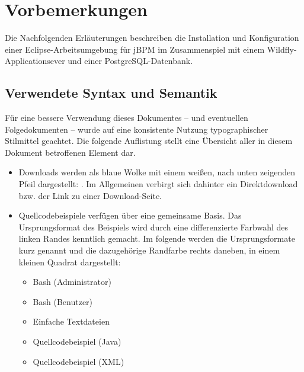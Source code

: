 \section{Vorbemerkungen}
Die Nachfolgenden Erläuterungen beschreiben die Installation und Konfiguration einer Eclipse-Arbeitsumgebung für jBPM im Zusammenspiel mit einem Wildfly-Applicationsever und einer PostgreSQL-Datenbank.
\subsection{Verwendete Syntax und Semantik}
Für eine bessere Verwendung dieses Dokumentes -- und eventuellen Folgedokumenten -- wurde auf eine konsistente Nutzung typographischer Stilmittel geachtet. Die folgende Auflistung stellt eine Übersicht aller in diesem Dokument betroffenen Element dar.

\begin{itemize}
	\item Downloads werden als blaue Wolke mit einem weißen, nach unten zeigenden Pfeil dargestellt: . Im Allgemeinen verbirgt sich dahinter ein Direktdownload bzw. der Link zu einer Download-Seite.
	\item Quellcodebeispiele verfügen über eine gemeinsame Basis. Das Ursprungsformat des Beispiels wird durch eine differenzierte Farbwahl des linken Randes kenntlich gemacht. Im folgende werden die Ursprungsformate kurz genannt und die dazugehörige Randfarbe rechts daneben, in einem kleinen Quadrat dargestellt:
	\begin{itemize}
		\item Bash (Administrator) 
		\item Bash (Benutzer) 
		\item Einfache Textdateien 
		\item Quellcodebeispiel (Java) 
		\item Quellcodebeispiel (XML) 
	\end{itemize}
\end{itemize}
